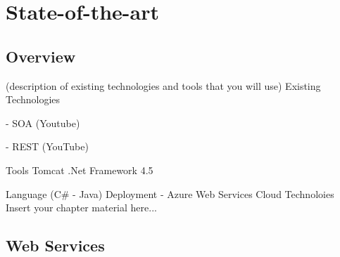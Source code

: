 
\chapter{State-of-the-art}
\label{chapter:stateofart}


\section{Overview}
\label{section:overview}

(description of existing technologies and tools that you will use)
Existing Technologies

- SOA (Youtube)

- REST (YouTube)

Tools
Tomcat
.Net Framework 4.5

Language (C# - Java)
Deployment -
Azure Web Services Cloud Technoloies
Insert your chapter material here...


\section{Web Services}
\label{section:webservices}

